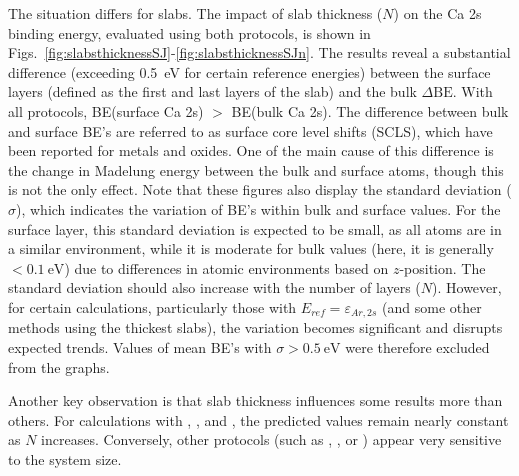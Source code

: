 \documentclass[%
aip,
amsmath,amssymb,
preprint,%
jcp,
showkeys,
]{revtex4-2}
\def\dbe{\ensuremath{\Delta\text{BE}}}
\begin{document}
The situation differs for slabs. The impact of slab thickness ($N$) on the Ca 2s binding energy, evaluated using both protocols, is shown in Figs.~\ref{fig:slabsthicknessSJ}-\ref{fig:slabsthicknessSJn}. The results reveal a substantial difference (exceeding \SI{0.5}{\electronvolt} for certain reference energies) between the surface layers (defined as the first and last layers of the slab) and the bulk \dbe{}. With all protocols, BE(surface Ca 2s) $>$ BE(bulk Ca 2s). The difference between bulk and surface BE's are referred to as surface core level shifts (SCLS),\cite{olovssonCorelevelShiftsComplex2006,bagusChemicalSignificanceXray2023} which have been reported for metals\cite{aldenInitioSurfaceCorelevel1993,weinertCorelevelShiftsBulk1995,olovssonCorelevelShiftsComplex2006} and oxides\cite{harmerSpeciesFormedCuprite2009,lousadaFirstStagesOxide2018,bagusRevisitingSurfaceCorelevel2019}. One of the main cause of this difference is the change in Madelung energy between the bulk and surface atoms\cite{nelinSurfaceCorelevelBinding2014}, though this is not the only effect\cite{bagusRevisitingSurfaceCorelevel2019,bagusChemicalSignificanceXray2023,bagusXrayPhotoelectronSpectroscopy2024}. 
Note that these figures also display the standard deviation ($\sigma$), which indicates the variation of BE's within bulk and surface values. For the surface layer, this standard deviation is expected to be small, as all atoms are in a similar environment, while it is moderate for bulk values (here, it is generally $<\SI{0.1}{\electronvolt}$) due to differences in atomic environments based on $z$-position. The standard deviation should also increase with the number of layers ($N$). However, for certain calculations, particularly those with $E_{ref}=\varepsilon_{Ar,2s}$ (and some other methods using the thickest slabs), the variation becomes significant and disrupts expected trends. Values of mean BE's with $\sigma > \SI{0.5}{\electronvolt}$ were therefore excluded from the graphs.


Another key observation is that slab thickness influences some results more than others. For calculations with , , and , the predicted values remain nearly constant as $N$ increases. Conversely, other protocols (such as , , or ) appear very sensitive to the system size. 
\end{document}
